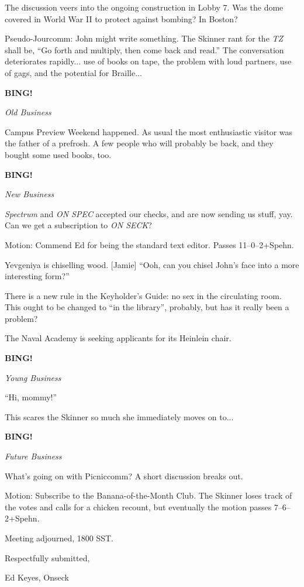\documentclass[12pt]{article}
\newcommand{\bing}{{\bf BING!} }
\newcommand{\goto}[1]{\bing \vskip 12pt \centerline{{\em{#1}}}}
\begin{document}
The discussion veers into the ongoing construction in Lobby 7.
Was the dome covered in World War II to protect against bombing?
In Boston?

Pseudo-Jourcomm: John might write something.  The Skinner rant for
the {\em TZ} shall be, ``Go forth and multiply, then come back and
read.''  The conversation deteriorates rapidly... use of books on
tape, the problem with loud partners, use of gags, and the
potential for Braille...

\goto{Old Business}

Campus Preview Weekend happened.  As usual the most enthusiastic
visitor was the father of a prefrosh.  A few people who will
probably be back, and they bought some used books, too.

\goto{New Business}

{\em Spectrum} and {\em ON SPEC} accepted our checks, and are now
sending us stuff, yay.  Can we get a subscription to {\em ON SECK}?

Motion: Commend Ed for being the standard text editor.  Passes
11--0--2+Spehn.

Yevgeniya is chiselling wood.  [Jamie] ``Ooh, can you chisel John's
face into a more interesting form?''

There is a new rule in the Keyholder's Guide: no sex in the
circulating room.  This ought to be changed to ``in the library'',
probably, but has it really been a problem?

The Naval Academy is seeking applicants for its Heinlein chair.

\goto{Young Business}

``Hi, mommy!''

This scares the Skinner so much she immediately moves on to...

\goto{Future Business}

What's going on with Picniccomm?  A short discussion breaks out.

Motion: Subscribe to the Banana-of-the-Month Club.  The Skinner
loses track of the votes and calls for a chicken recount, but
eventually the motion passes 7--6--2+Spehn.

\vspace{12pt}

\noindent
Meeting adjourned, 1800 SST.

\vspace{18pt}

\centerline{Respectfully submitted,}
\centerline{Ed Keyes, Onseck}
\end{document}
